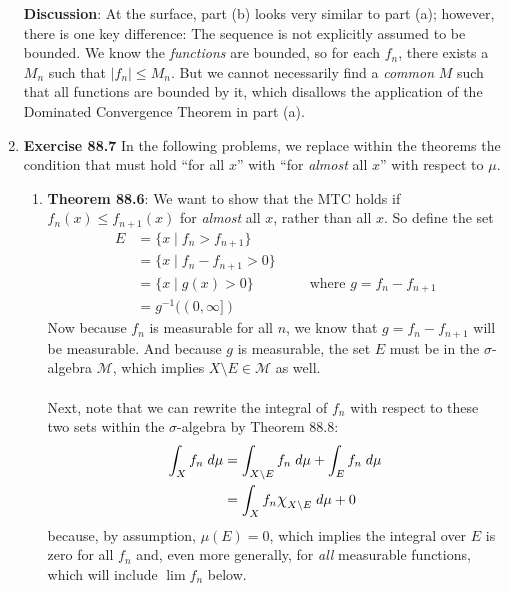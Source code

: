\documentclass[12pt]{article}
\theoremstyle{plain}
\theoremstyle{definition}
\theoremstyle{remark}
\newcommand*{\Chi}{\mbox{\large$\chi$}} %
\begin{document}
\begin{enumerate}
\textbf{Discussion}: At the surface, part (b) looks very similar to part (a); however, there is one key difference: The sequence is not explicitly assumed to be bounded. We know the \emph{functions} are bounded, so for each $f_n$, there exists a $M_n$ such that $|f_n|\leq M_n$. But we cannot necessarily find a \emph{common} $M$ such that all functions are bounded by it, which disallows the application of the Dominated Convergence Theorem in part (a).

\newpage
\item \textbf{Exercise 88.7} In the following problems, we replace within the theorems the condition that must hold ``for all $x$'' with ``for \emph{almost} all $x$'' with respect to $\mu$.
\begin{enumerate}
    \item \textbf{Theorem 88.6}: We want to show that the MTC holds if $f_n(x)\leq f_{n+1}(x)$ for \emph{almost} all $x$, rather than all $x$. So define the set
\begin{align*}
    E &= \{x \; | \; f_n > f_{n+1}\} \\
        &= \{x \; | \; f_n - f_{n+1} > 0\} \\
        &= \{x \; | \; g(x) > 0\} \qquad \qquad
        \text{where $g=f_n - f_{n+1}$} \\
    &= g^{-1}((0,\infty]) 
\end{align*}
Now because $f_n$ is measurable for all $n$, we know that $g=f_n-f_{n+1}$ will be measurable. And because $g$ is measurable, the set $E$ must be in the $\sigma$-algebra $\mathscr{M}$, which implies $X\setminus E\in\mathscr{M}$ as well.
\\
\\
Next, note that we can rewrite the integral of $f_n$ with respect to these two sets within the $\sigma$-algebra by Theorem 88.8:
\begin{align*}
    \int_X f_n \; d\mu &= \int_{X\setminus E} f_n \; d\mu
    + \int_E f_n \; d\mu\\
    &= \int_X f_n \Chi_{X\setminus E} \; d\mu+ 0
\end{align*}
because, by assumption, $\mu(E)=0$, which implies the integral over $E$ is zero for all $f_n$ and, even more generally, for \emph{all} measurable functions, which will include $\lim f_n$ below. 


\end{enumerate}
\end{enumerate}
\end{document}
